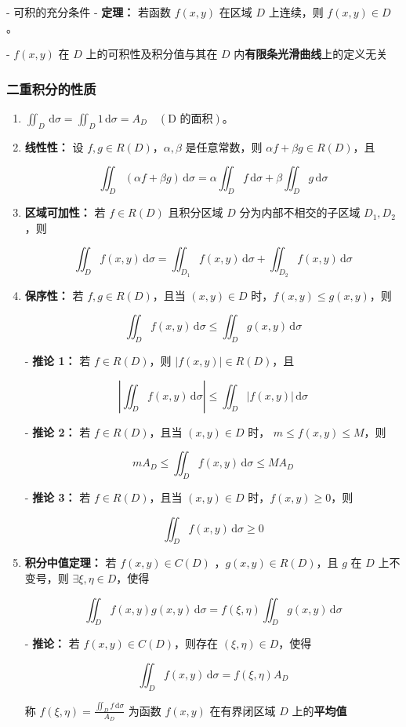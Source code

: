 \documentclass[lang = zh , final , oneside , openany , titlepage , zihao = -4 , linespread = 1.3 , baselineskip = false , cjk-font = windows , text-font = newtx , math-font = newtx]{sjtureport}
\begin{document}
- 可积的充分条件
  - \textbf{定理：} 若函数 \(f(x,y)\) 在区域 \(D\) 上连续，则 \(f(x,y)\in D\)。

- \(f(x,y)\) 在 \(D\) 上的可积性及积分值与其在 \(D\) 内\textbf{有限条光滑曲线}上的定义无关

\subsubsection{二重积分的性质}

\begin{enumerate}
    \item \(\iint_D\,\mathrm{d}\sigma = \iint_D 1\,\mathrm{d}\sigma = A_D \quad\left(\text{D 的面积}\right)\)。
    \item \textbf{线性性：} 设 \(f,g\in R(D)\)，\(\alpha, \beta\) 是任意常数，则 \(\alpha f +\beta g \in R(D)\)，且

    \[
    \iint_D (\alpha f +\beta g)\,\mathrm{d}\sigma = \alpha \iint_D f\,\mathrm{d}\sigma + \beta \iint_D g\,\mathrm{d}\sigma
    \]

    \item \textbf{区域可加性：} 若 \(f\in R(D)\) 且积分区域 \(D\) 分为内部不相交的子区域 \(D_1, D_2\)，则

    \[
    \iint_D f(x,y) \,\mathrm{d}\sigma = \iint_{D_1} f(x,y)\,\mathrm{d}\sigma + \iint_{D_2} f(x,y)\,\mathrm{d}\sigma
    \]

    \item \textbf{保序性：} 若 \(f,g\in R(D)\)，且当 \((x,y)\in D\) 时，\(f(x,y)\leq g(x,y)\)，则

    \[
    \iint_D f(x,y)\,\mathrm{d}\sigma \leq \iint_D g(x,y)\,\mathrm{d}\sigma
    \]

    - \textbf{推论 1：} 若 \(f\in R(D)\)，则 \(\vert f(x,y) \vert \in R(D)\)，且

    \[
    \left\vert \iint_D f(x,y)\,\mathrm{d}\sigma \right\vert \leq \iint_D \vert f(x,y) \vert \,\mathrm{d}\sigma
    \]

    - \textbf{推论 2：} 若 \(f\in R(D)\)，且当 \((x,y)\in D\) 时， \(m\leq f(x,y) \leq M\)，则

    \[
    mA_D \leq \iint_D f(x,y)\,\mathrm{d}\sigma \leq MA_D
    \]

    - \textbf{推论 3：} 若 \(f\in R(D)\)，且当 \((x,y)\in D\) 时，\(f(x,y) \geq 0\)，则

    \[
    \iint_D f(x,y)\,\mathrm{d}\sigma \geq 0
    \]

    \item \textbf{积分中值定理：} 若 \(f(x,y)\in C(D)\) ，\(g(x,y)\in R(D)\)，且 \(g\) 在 \(D\) 上不变号，则 \(\exists \xi, \eta \in D\)，使得

    \[
    \iint_D f(x,y)g(x,y)\,\mathrm{d}\sigma = f(\xi, \eta )\iint_D g(x,y)\,\mathrm{d}\sigma
    \]

    - \textbf{推论：} 若 \(f(x,y)\in C(D)\)，则存在 \((\xi, \eta )\in D\)，使得

    \[
    \iint_D f(x,y)\,\mathrm{d}\sigma = f(\xi, \eta )A_D
    \]

    称 \(f(\xi,\eta) = \frac{\iint_D f\,\mathrm{d}\sigma}{A_D}\) 为函数 \(f(x,y)\) 在有界闭区域 \(D\) 上的\textbf{平均值}
\end{enumerate}
\end{document}
